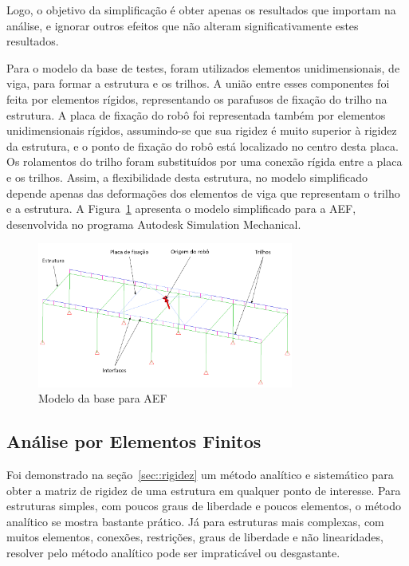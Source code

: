 Logo, o objetivo da simplificação é obter apenas os resultados que importam
na análise, e ignorar outros efeitos que não alteram significativamente
estes resultados. 

Para o modelo da base de testes, foram utilizados elementos unidimensionais, de
viga, para formar a estrutura e os trilhos. A união entre esses componentes foi
feita por elementos rígidos, representando os parafusos de fixação do trilho na
estrutura. A placa de fixação do robô foi representada também por elementos
unidimensionais rígidos, assumindo-se que sua rigidez é muito superior à rigidez
da estrutura, e o ponto de fixação do robô está localizado no centro desta
placa.
Os rolamentos do trilho foram substituídos por uma conexão rígida entre a placa
e os trilhos. Assim, a flexibilidade desta estrutura, no modelo simplificado
depende apenas das deformações dos elementos de viga que representam o trilho e
a estrutura. A Figura~\ref{fig::estrutFEA} apresenta o modelo simplificado para
a AEF, desenvolvida no programa Autodesk Simulation Mechanical.

\begin{figure}[h]
	\centering 
 	\includegraphics[width=0.75\textwidth]{figs/estrutFEA}
 	\caption{Modelo da base para AEF}
 	\label{fig::estrutFEA}
\end{figure}

\subsection{Análise por Elementos Finitos} \label{sec::aef}

Foi demonstrado na seção~\ref{sec::rigidez} um método analítico e sistemático
para obter a matriz de rigidez de uma estrutura em qualquer ponto de
interesse. Para estruturas simples, com poucos graus de liberdade e poucos
elementos, o método analítico se mostra bastante prático. Já para estruturas
mais complexas, com muitos elementos, conexões, restrições, graus de liberdade
e não linearidades, resolver pelo método analítico pode ser impraticável ou
desgastante.

